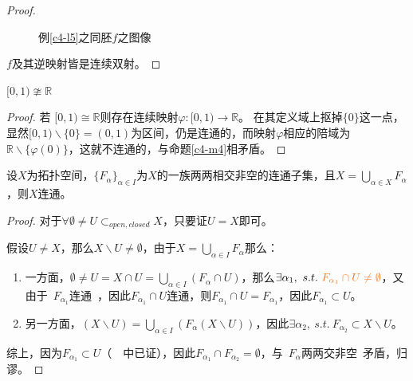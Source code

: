 \documentclass[lang=cn,10pt,device=pad]{elegantbook}
\newcommand{\cusong}{\CJKfamily{cusong}}%
\newcommand{\tl}[1]{\textcolor{myor}{#1}}
\newcommand{\lei}[1]{~\textcolor{myblu}{\cusong{#1}}~}
\newcommand{\lanse}[1]{~\textcolor{myblu}{#1}~}
\newcommand{\st}{~s.t.~}
\newcommand{\dabing}{\displaystyle\bigcup}
\newcommand{\dkh}[1]{\{#1\}}
\newcommand{\chadiao}{\backslash}
\newcommand{\R}{\mathbb{R}}
\begin{document}
\begin{proof}
\begin{figure}[h]
\caption{例\ref{c4-l5}之同胚$f$之图像}
	\end{figure}
	$f$及其逆映射皆是连续双射。
\end{proof}

\begin{example}
	$[0,1)\ncong \mathbb{R}$
\end{example}
\begin{proof}
若	$[0,1)\cong \mathbb{R}$则存在连续映射$\varphi :[0,1)\longrightarrow \mathbb{R}$。
在其定义域上抠掉$\dkh{0}$这一点，显然$[0,1)\chadiao\dkh{0}=(0,1)$为区间，仍是连通的，而映射$\varphi$相应的陪域为$\R \chadiao \dkh{\varphi(0)}$，这就不连通的，与命题\ref{c4-m4}相矛盾。
\end{proof}


\begin{proposition}[连通的充分条件]\label{c4-m5}
	设$X$为拓扑空间，$\dkh{F_{\alpha}}_{\alpha\in I}$为$X$的一族两两相交非空的连通子集，且$X=\dabing_{\alpha \in X}F_{\alpha}$，则$X$连通。
\end{proposition}
\begin{proof}
	对于$\forall\emptyset\neq U\subset_{open,closed} X$，只要证$U=X$即可。
	
	假设$U\neq X$，那么$X\chadiao U\neq \emptyset$，由于$X = \dabing_{\alpha\in I}F_{\alpha}$那么：
	\begin{enumerate}
		\item 一方面，$\emptyset\neq U = X\cap U = \dabing_{\alpha\in I}(F_{\alpha}\cap U)$，那么$\exists \alpha_{1},\st \tl{F_{\alpha_{1}}\cap U\neq \emptyset}$，又由于\lanse{$F_{\alpha_{1}}$连通}，因此\tl{$F_{\alpha_{1}}\cap U$连通}，则$F_{\alpha_{1}}\cap U = F_{\alpha_{1}}$，因此$F_{\alpha_{1}}\subset U$。
		\item 另一方面，$(X\chadiao U) = \dabing_{\alpha \in I}(F_{\alpha}(X\chadiao U))$，因此$\exists \alpha_{2},\st F_{\alpha_{2}}\subset X\chadiao U$。
	\end{enumerate}
	综上，因为$F_{\alpha_{1}}\subset U$（\lei{1}中已证），因此$F_{\alpha_{1}}\cap F_{\alpha_{2}}=\emptyset$，与\lanse{$F_{\alpha}$两两交非空}矛盾，归谬。
\end{proof}
\end{document}
